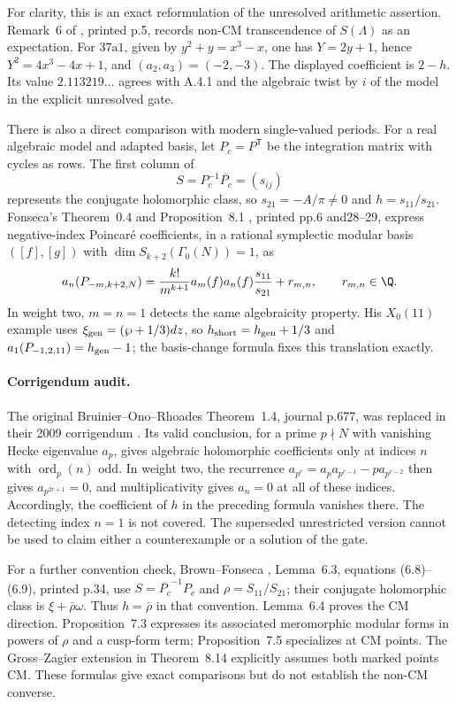 For clarity, this is an exact reformulation of the unresolved arithmetic assertion. Remark~6 of \cite{EllAGOR2015}, printed p.5, records non-CM transcendence of $S(\Lambda)$ as an expectation. For $37\mathrm a1$, given by $y^2+y=x^3-x$, one has $Y=2y+1$, hence $Y^2=4x^3-4x+1$, and $(a_2,a_3)=(-2,-3)$. The displayed coefficient is $2-h$. Its value $2.113219\ldots$ agrees with A.4.1 and the algebraic twist by $i$ of the model in the explicit unresolved gate.

There is also a direct comparison with modern single-valued periods. For a real algebraic model and adapted basis, let $P_c=P^{\mathsf T}$ be the integration matrix with cycles as rows. The first column of
\[
 S=P_c^{-1}\overline{P_c}=(s_{ij})
\]
represents the conjugate holomorphic class, so $s_{21}=-A/\pi\ne0$ and $h=s_{11}/s_{21}$. Fonseca's Theorem~0.4 and Proposition~8.1 \cite{EllFonseca2020}, printed pp.6 and28--29, express negative-index Poincar\'e coefficients, in a rational symplectic modular basis $([f],[g])$ with $\dim S_{k+2}(\Gamma_0(N))=1$, as
\[
 a_n(P_{-m,k+2,N})
 =\frac{k!}{m^{k+1}}a_m(f)a_n(f)\frac{s_{11}}{s_{21}}+r_{m,n},
 \qquad r_{m,n}\in\Q.
\]
In weight two, $m=n=1$ detects the same algebraicity property. His $X_0(11)$ example uses $\xi_{\rm gen}=(\wp+1/3)dz$, so $h_{\rm short}=h_{\rm gen}+1/3$ and $a_1(P_{-1,2,11})=h_{\rm gen}-1$; the basis-change formula fixes this translation exactly.

\paragraph{Corrigendum audit.}
The original Bruinier--Ono--Rhoades Theorem~1.4, journal p.677, was replaced in their 2009 corrigendum \cite{EllBORCorr2009}. Its valid conclusion, for a prime $p\nmid N$ with vanishing Hecke eigenvalue $a_p$, gives algebraic holomorphic coefficients only at indices $n$ with $\operatorname{ord}_p(n)$ odd. In weight two, the recurrence
$a_{p^r}=a_p a_{p^{r-1}}-p a_{p^{r-2}}$
then gives $a_{p^{2r+1}}=0$, and multiplicativity gives $a_n=0$ at all of these indices. Accordingly, the coefficient of $h$ in the preceding formula vanishes there. The detecting index $n=1$ is not covered. The superseded unrestricted version cannot be used to claim either a counterexample or a solution of the gate.

For a further convention check, Brown--Fonseca \cite{EllBrownFonseca2025}, Lemma~6.3, equations (6.8)--(6.9), printed p.34, use $S=\overline{P_c}^{-1}P_c$ and $\rho=S_{11}/S_{21}$; their conjugate holomorphic class is $\xi+\bar\rho\omega$. Thus $h=\bar\rho$ in that convention. Lemma~6.4 proves the CM direction. Proposition~7.3 expresses its associated meromorphic modular forms in powers of $\rho$ and a cusp-form term; Proposition~7.5 specializes at CM points. The Gross--Zagier extension in Theorem~8.14 explicitly assumes both marked points CM. These formulas give exact comparisons but do not establish the non-CM converse.

